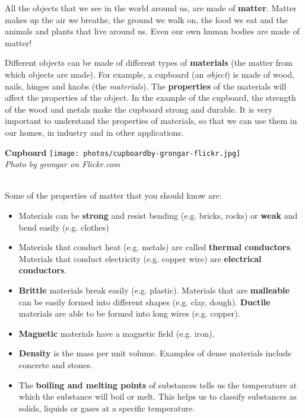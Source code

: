             \label{m38708*id62175}All the objects that we see in the world around us, are made of \textbf{matter}. Matter makes up the air we breathe, the ground we walk on, the food we eat and the animals and plants that live around us. Even our own human bodies are made of matter! \newline \\
\begin{minipage}{.5\textwidth}
      \label{m38708*id62185}Different objects can be made of different types of \textbf{materials} (the matter from which objects are made). For example, a cupboard (an \textsl{object}) is made of wood, nails, hinges and knobs (the \textsl{materials}). The \textbf{properties} of the materials will affect the properties of the object. In the example of the cupboard, the strength of the wood and metals make the cupboard strong and durable. It is very important to understand the properties of materials, so that we can use them in our homes, in industry and in other applications.
\end{minipage}
\begin{minipage}{.5\textwidth}
\begin{center}
\textbf{Cupboard}
 \texttt{[image: photos/cupboardby-grongar-flickr.jpg]}\\
\textit{Photo by grongar on Flickr.com}
\end{center}
\end{minipage} \\
\label{m38708*id0132}Some of the properties of matter that you should know are:
\label{m38708*lid825}\begin{itemize}[noitemsep]
  \item Materials can be \textbf{strong} and resist bending (e.g. bricks, rocks) or \textbf{weak} and bend easily (e.g. clothes)
  \item Materials that conduct heat (e.g. metals) are called \textbf{thermal conductors}. Materials that conduct electricity (e.g. copper wire) are \textbf{electrical conductors}.
  \item \textbf{Brittle} materials break easily (e.g. plastic). Materials that are \textbf{malleable} can be easily formed into different shapes (e.g. clay, dough). \textbf{Ductile} materials are able to be formed into long wires (e.g. copper).
  \item \textbf{Magnetic} materials have a magnetic field (e.g. iron).
  \item \textbf{Density} is the mass per unit volume. Examples of dense materials include concrete and stones.
  \item The \textbf{boiling and melting points} of substances tells us the temperature at which the substance will boil or melt. This helps us to classify substances as solids, liquids or gases at a specific temperature.\end{itemize}

